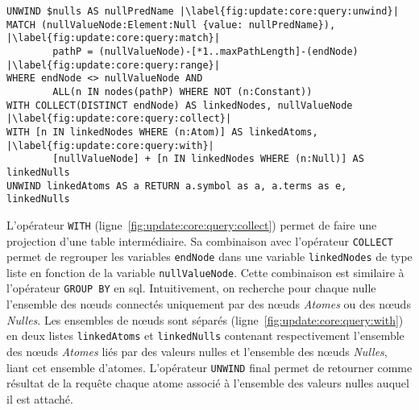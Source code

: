 \begin{lstlisting}[name=qcore, language=cypher, caption=Requête Cypher pour calculer l'ensemble $\textsf{LinkedNull}_{\mathcal{D}}$, label={fig:update:core:query}, escapechar=|, float, floatplacement=htb]
UNWIND $nulls AS nullPredName |\label{fig:update:core:query:unwind}|
MATCH (nullValueNode:Element:Null {value: nullPredName}), |\label{fig:update:core:query:match}|
		pathP = (nullValueNode)-[*1..maxPathLength]-(endNode) |\label{fig:update:core:query:range}|
WHERE endNode <> nullValueNode AND
		ALL(n IN nodes(pathP) WHERE NOT (n:Constant))
WITH COLLECT(DISTINCT endNode) AS linkedNodes, nullValueNode |\label{fig:update:core:query:collect}|
WITH [n IN linkedNodes WHERE (n:Atom)] AS linkedAtoms, |\label{fig:update:core:query:with}|
		[nullValueNode] + [n IN linkedNodes WHERE (n:Null)] AS linkedNulls
UNWIND linkedAtoms AS a RETURN a.symbol as a, a.terms as e, linkedNulls
\end{lstlisting}

L'opérateur \verb|WITH| (ligne~\ref{fig:update:core:query:collect}) permet de faire une projection d'une table intermédiaire.
Sa combinaison avec l'opérateur \verb|COLLECT| permet de regrouper les variables \verb|endNode| dans une variable \verb|linkedNodes| de type liste en fonction de la variable \verb|nullValueNode|.
Cette combinaison est similaire à l'opérateur \verb|GROUP BY| en \gls{sql}.
Intuitivement, on recherche pour chaque nulle l'ensemble des nœuds connectés uniquement par des nœuds \textit{Atomes} ou des nœuds \textit{Nulles}.
Les ensembles de nœuds sont séparés (ligne~\ref{fig:update:core:query:with}) en deux listes \verb|linkedAtoms| et \verb|linkedNulls| contenant respectivement l'ensemble des nœuds \textit{Atomes} liés par des valeurs nulles et l'ensemble des nœuds \textit{Nulles}, liant cet ensemble d'atomes.
L'opérateur \verb|UNWIND| final permet de retourner comme résultat de la requête chaque atome associé à l'ensemble des valeurs nulles auquel il est attaché.

